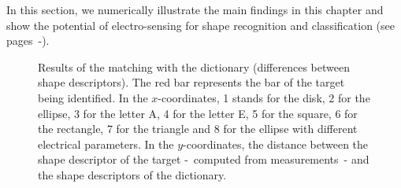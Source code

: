\label{sec:pnas-figures}

In this section, we numerically illustrate the main findings in
this chapter and show the potential of electro-sensing for shape
recognition and classification (see pages~\pageref{fig:results-SD-banana}-\pageref{fig:results-imag-ellipse-ratio}).


\begin{figure}[!h]
\centering
{}
\caption{Results of the matching with
the dictionary (differences between shape descriptors).
The red bar represents the bar of the
target being identified. In the $x$-coordinates, 1 stands for the
disk, 2 for the ellipse, 3 for the letter A, 4 for the letter E, 5
for the square, 6 for the rectangle, 7 for the triangle and 8 for
the ellipse with different electrical parameters. In the
$y$-coordinates, the distance between the shape descriptor of the
target -~computed from measurements~- and the shape descriptors of
the dictionary. }
\end{figure}

